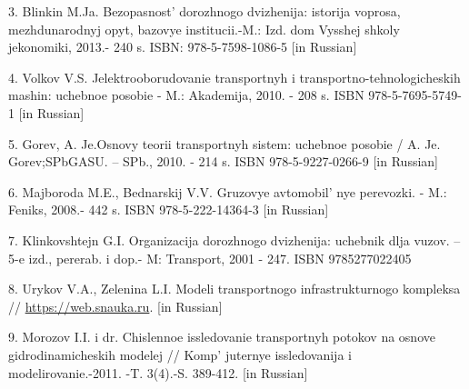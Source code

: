 3. Blinkin M.Ja. Bezopasnost'{} dorozhnogo dvizhenija:
istorija voprosa, mezhdunarodnyj opyt, bazovye institucii.-M.: Izd. dom
Vysshej shkoly jekonomiki, 2013.- 240 s. ISBN: 978-5-7598-1086-5 {[}in
Russian{]}

4. Volkov V.S. Jelektrooborudovanie transportnyh i
transportno-tehnologicheskih mashin: uchebnoe posobie - M.: Akademija,
2010. - 208 s. ISBN 978-5-7695-5749-1 {[}in Russian{]}

5. Gorev, A. Je.Osnovy teorii transportnyh sistem: uchebnoe posobie / A.
Je. Gorev;SPbGASU. -- SPb., 2010. - 214 s. ISBN 978-5-9227-0266-9 {[}in
Russian{]}

6. Majboroda M.E., Bednarskij V.V. Gruzovye
avtomobil' nye perevozki. - M.: Feniks, 2008.- 442 s.
ISBN 978-5-222-14364-3 {[}in Russian{]}

7. Klinkovshtejn G.I. Organizacija dorozhnogo dvizhenija: uchebnik dlja
vuzov. -- 5-e izd., pererab. i dop.- M: Transport, 2001 - 247. ISBN
9785277022405

8. Urykov V.A., Zelenina L.I. Modeli transportnogo infrastrukturnogo
kompleksa //
\href{https://web.snauka.ru/issues/2014.\%2018.06.2020}{https://web.snauka.ru}. {[}in Russian{]}

9. Morozov I.I. i dr. Chislennoe issledovanie transportnyh potokov na
osnove gidrodinamicheskih modelej // Komp' juternye
issledovanija i modelirovanie.-2011. -T. 3(4).-S. 389-412. {[}in
Russian{]}

